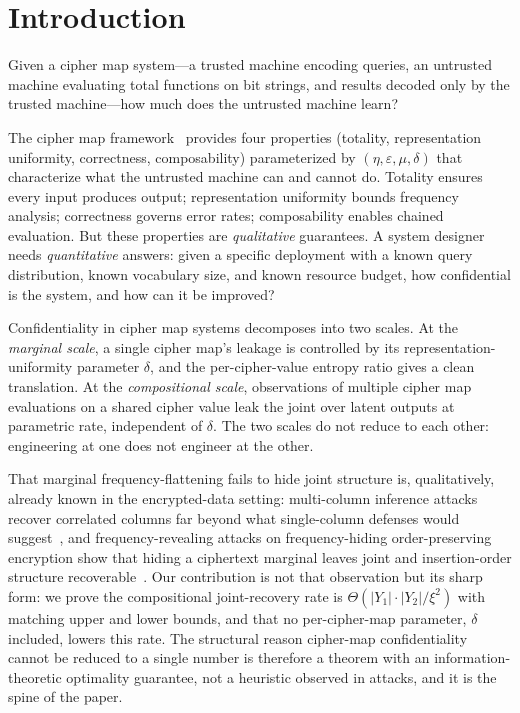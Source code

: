 \documentclass[11pt]{article}
\theoremstyle{definition}
\theoremstyle{plain}
\theoremstyle{remark}
\begin{document}
\section{Introduction}
\label{sec:intro}

Given a cipher map system---a trusted machine encoding queries, an
untrusted machine evaluating total functions on bit strings, and results
decoded only by the trusted machine---how much does the untrusted machine
learn?

The cipher map framework~\cite{towell2026cipher} provides four properties
(totality, representation uniformity, correctness, composability)
parameterized by $(\eta, \varepsilon, \mu, \delta)$ that characterize
what the untrusted machine can and cannot do.  Totality ensures every
input produces output; representation uniformity bounds frequency
analysis; correctness governs error rates; composability enables chained
evaluation.  But these properties are \emph{qualitative} guarantees.  A
system designer needs \emph{quantitative} answers: given a specific
deployment with a known query distribution, known vocabulary size, and
known resource budget, how confidential is the system, and how can it be
improved?

Confidentiality in cipher map systems
decomposes into two scales.  At the \emph{marginal scale}, a single
cipher map's leakage is controlled by its representation-uniformity
parameter $\delta$, and the per-cipher-value entropy ratio gives a
clean translation.  At the \emph{compositional scale}, observations of
multiple cipher map evaluations on a shared cipher value leak the
joint over latent outputs at parametric rate, independent of $\delta$.
The two scales do not reduce to each other: engineering at one does
not engineer at the other.

That marginal frequency-flattening fails to hide joint structure is,
qualitatively, already known in the encrypted-data setting: multi-column
inference attacks recover correlated columns far beyond what
single-column defenses would suggest~\cite{bindschaedler2018tao}, and
frequency-revealing attacks on frequency-hiding order-preserving
encryption show that hiding a ciphertext marginal leaves joint and
insertion-order structure recoverable~\cite{cao2023frequency}.  Our
contribution is not that observation but its sharp form: we prove the
compositional joint-recovery rate is
$\Theta(|Y_1|\cdot|Y_2|/\xi^2)$ with matching upper and lower bounds,
and that no per-cipher-map parameter, $\delta$ included, lowers this rate.
The structural reason cipher-map confidentiality cannot be reduced to
a single number is therefore a theorem with an information-theoretic
optimality guarantee, not a heuristic observed in attacks, and it is
the spine of the paper.
\end{document}
